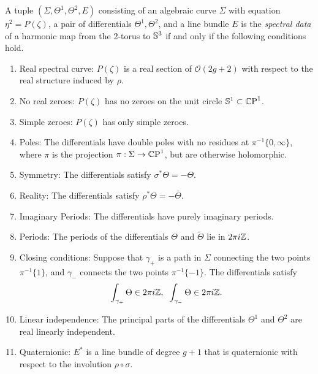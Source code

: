 \documentclass{article}
\begin{document}
\begin{thm}[Hitchin]\label{thm:Hitchin}
A tuple $(\Sigma,\Theta^1,\Theta^2,E)$ consisting of an algebraic curve $\Sigma$ with equation $\eta^2 = P(\zeta)$, a pair of differentials $\Theta^1, \Theta^2$, and a line bundle $E$ is the \emph{spectral data} of a harmonic map from the 2-torus to $\S^3$ if and only if the following conditions hold.
\begin{enumerate}[label=(P.\arabic*)]
\item\label{P:real curve} Real spectral curve: $P(\zeta)$ is a real section of $\mathcal{O}(2g+2)$ with respect to the real structure induced by $\rho$.
\item\label{P:no real zeroes} No real zeroes: $P(\zeta)$ has no zeroes on the unit circle $\S^1\subset\CP^1$.
\item\label{P:simple zeroes} Simple zeroes: $P(\zeta)$ has only simple zeroes.
\item\label{P:poles} Poles: The differentials have double poles with no residues at $\pi^{-1}\{0,\infty\}$, where $\pi$ is the projection $\pi: \Sigma \to \CP^1$, but are otherwise holomorphic.
\item\label{P:symmetry} Symmetry: The differentials satisfy $\sigma^* \Theta = - \Theta$.
\item\label{P:reality} Reality: The differentials satisfy $\rho^* \Theta = - \bar{\Theta}$.
\item\label{P:imaginary periods} Imaginary Periods: The differentials have purely imaginary periods.
\item\label{P:periods} Periods: The periods of the differentials $\Theta$ and $\tilde{\Theta}$ lie in $2\pi\iu\Z$.
\item\label{P:closing} Closing conditions: Suppose that $\gamma_+$ is a path in $\Sigma$ connecting the two points $\pi^{-1}\{1\}$, and $\gamma_-$ connects the two points $\pi^{-1}\{-1\}$. The differentials satisfy
\[
\int_{\gamma_+}\Theta \in 2\pi\iu\Z,\;\; 
\int_{\gamma_-}\Theta \in 2\pi\iu\Z.
\]
\item\label{P:linear independence} Linear independence: The principal parts of the differentials $\Theta^1$ and $\Theta^2$ are real linearly independent.
\item\label{P:quaternionic} Quaternionic: $E^*$ is a line bundle of degree $g+1$ that is quaternionic with respect to the involution $\rho \circ \sigma$.
\end{enumerate}
\end{thm}
\end{document}
